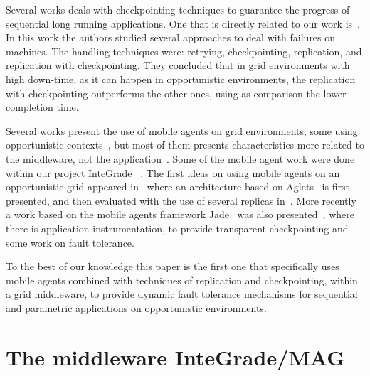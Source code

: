 \documentclass[times, 09pt, twocolumn]{article}
\begin{document}
Several works deals with checkpointing techniques to guarantee the progress of
sequential long running applications. One that is directly related to our
work is~\cite{hwang03}. In this work the authors studied several approaches to
deal with failures on machines. The handling techniques were: retrying, checkpointing,
replication, and replication with checkpointing. They concluded that in grid
environments with high down-time, as it can happen in opportunistic environments,
the replication with checkpointing outperforms the other ones, using as comparison
the lower completion time.

Several works present the use of mobile agents on grid environments, some using
opportunistic contexts~\cite{fukuda03}, but most of them presents characteristics
more related to the middleware, not the
application~\cite{cao02,cao01,loke03,martino04}. Some of the mobile agent work
were done within our project InteGrade~ \cite{goldchleger04}. The first ideas on
using mobile agents on an opportunistic grid appeared in~\cite{barbosa04} where
an architecture based on Aglets~\cite{aglets} is first presented, and then
evaluated with the use of several replicas in~\cite{barbosa05}. More recently a
work based on the mobile agents framework Jade~\cite{jade} was also
presented~\cite{lopes05,lopes06_2}, where there is application instrumentation, to
provide transparent checkpointing and some work on fault tolerance.

To the best of our knowledge this paper is the first one that
specifically uses mobile agents combined with techniques of
replication and checkpointing, within a grid middleware, to provide
dynamic fault tolerance mechanisms for sequential and parametric applications
on opportunistic environments.


\section{The middleware InteGrade/MAG}\label{sec:arch}
\end{document}
